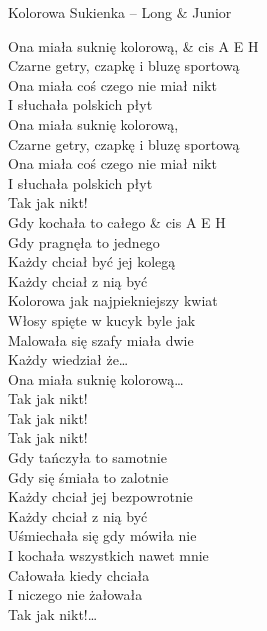 \begin{piosenka}{Kolorowa Sukienka -- Long $\&$ Junior}

 Ona miała suknię kolorową, & cis A E H \\
 Czarne getry, czapkę i bluzę sportową \\
 Ona miała coś czego nie miał nikt \\
 I słuchała polskich płyt \\
 Ona miała suknię kolorową, \\
 Czarne getry, czapkę i bluzę sportową \\
 Ona miała coś czego nie miał nikt \\
 I słuchała polskich płyt \\
 Tak jak nikt! \\[\zwrotkaspace]

Gdy kochała to całego & cis A E H \\
Gdy pragnęła to jednego \\
Każdy chciał być jej kolegą \\
Każdy chciał z nią być \\
Kolorowa jak najpiekniejszy kwiat \\
Włosy spięte w kucyk byle jak \\
Malowała się szafy miała dwie \\
Każdy wiedział że\ldots \\[\zwrotkaspace]

 Ona miała suknię kolorową\ldots \\[\zwrotkaspace]

 Tak jak nikt! \\
 Tak jak nikt! \\
 Tak jak nikt! \\[\zwrotkaspace]

Gdy tańczyła to samotnie \\
Gdy się śmiała to zalotnie \\
Każdy chciał jej bezpowrotnie \\
Każdy chciał z nią być \\
Uśmiechała się gdy mówiła nie \\
I kochała wszystkich nawet mnie \\
Całowała kiedy chciała \\
I niczego nie żałowała \\[\zwrotkaspace]

 Tak jak nikt!\ldots \\[\zwrotkaspace]

\end{piosenka}